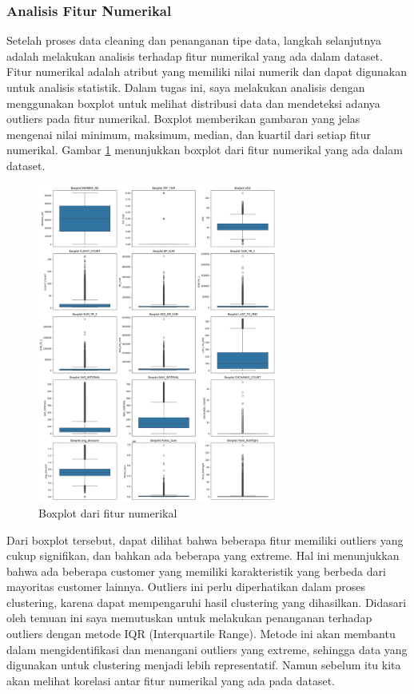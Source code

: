 \subsubsection{Analisis Fitur Numerikal}
Setelah proses data cleaning dan penanganan tipe data, langkah selanjutnya adalah melakukan analisis terhadap fitur numerikal yang ada dalam dataset. Fitur numerikal adalah atribut yang memiliki nilai numerik dan dapat digunakan untuk analisis statistik. Dalam tugas ini, saya melakukan analisis dengan menggunakan boxplot untuk melihat distribusi data dan mendeteksi adanya outliers pada fitur numerikal. Boxplot memberikan gambaran yang jelas mengenai nilai minimum, maksimum, median, dan kuartil dari setiap fitur numerikal. Gambar \ref{fig:boxplot} menunjukkan boxplot dari fitur numerikal yang ada dalam dataset.

\begin{figure}[H]
    \centering
    \includegraphics[width=0.7\textwidth]{gambar/boxplot.png}
    \caption{Boxplot dari fitur numerikal}
    \label{fig:boxplot}
\end{figure}

Dari boxplot tersebut, dapat dilihat bahwa beberapa fitur memiliki outliers yang cukup signifikan, dan bahkan ada beberapa yang extreme. Hal ini menunjukkan bahwa ada beberapa customer yang memiliki karakteristik yang berbeda dari mayoritas customer lainnya. Outliers ini perlu diperhatikan dalam proses clustering, karena dapat mempengaruhi hasil clustering yang dihasilkan. Didasari oleh temuan ini saya memutuskan untuk melakukan penanganan terhadap outliers dengan metode IQR (Interquartile Range). Metode ini akan membantu dalam mengidentifikasi dan menangani outliers yang extreme, sehingga data yang digunakan untuk clustering menjadi lebih representatif. Namun sebelum itu kita akan melihat korelasi antar fitur numerikal yang ada pada dataset.

